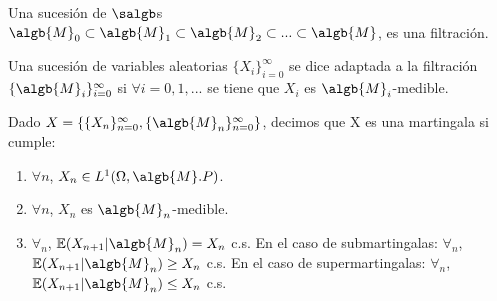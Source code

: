 \documentclass{apuntes}
\begin{document}
\begin{defn}[Filtración]
Una sucesión de $\salgb$s $\algb{M}_0 \subset \algb{M}_1 \subset \algb{M}_2 \subset ... \subset \algb{M}$, es una filtración.
\end{defn}

\begin{defn}
Una sucesión de variables aleatorias $\{X_i\}_{i=0}^{\infty}$ se dice adaptada a la filtración $\{\algb{M}_i\}_{i=0}^{\infty}$ si $\forall i = 0,1,...$ se tiene que $X_i$ es $\algb{M}_i$-medible.
\end{defn}

\begin{defn}[Martingala]
Dado $X=\{\{X_n\}_{n=0}^{\infty}, \{\algb{M}_n\}_{n=0}^{\infty}\}$, decimos que X es una martingala si cumple:
\begin{enumerate}
\item $\forall n$, $X_n \in L^1(\Omega, \algb{M}. P)$.
\item $\forall n$, $X_n$ es $\algb{M}_n$-medible.
\item $\forall_n$, $\mathbb{E}(X_{n+1}|\algb{M}_n)=X_n$ c.s.
En el caso de submartingalas: $\forall_n$, $\mathbb{E}(X_{n+1}|\algb{M}_n)\geq X_n$ c.s.
En el caso de supermartingalas: $\forall_n$, $\mathbb{E}(X_{n+1}|\algb{M}_n)\leq X_n$ c.s.
\end{enumerate}
\end{defn}
\end{document}
